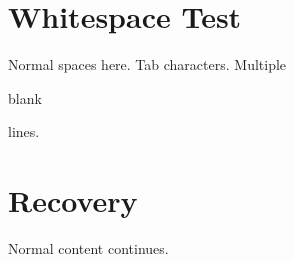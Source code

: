 \documentclass{article}
\begin{document}
\section{Whitespace Test}
Normal    spaces    here.
	Tab characters.
Multiple


blank


lines.
\section{Recovery}
Normal content continues.
\end{document}
